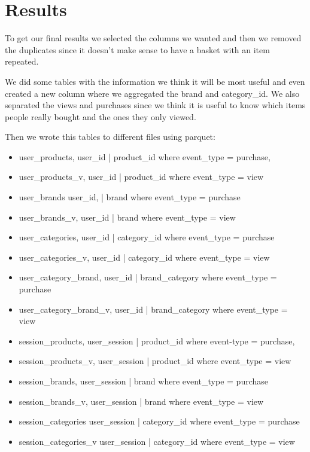 \section{Results}
\label{results}

To get our final results we selected the columns we wanted and then we removed the duplicates since it doesn't make
sense to have a basket with an item repeated. 

We did some tables with the information we think it will be most useful and even created a new column where we aggregated
the brand and category_id. We also separated the views and purchases since we think it is useful to know which items
people really bought and the ones they only viewed.

Then we wrote this tables to different files using parquet:
\begin{itemize}
    \item user_products, user_id | product_id where event_type = purchase, 
    \item user_products_v, user_id | product_id where event_type = view 
    \item user_brands user_id, | brand where event_type = purchase
    \item user_brands_v, user_id | brand where event_type = view
    \item user_categories, user_id | category_id where event_type = purchase
    \item user_categories_v, user_id | category_id where event_type = view
    \item user_category_brand, user_id | brand_category where event_type = purchase
    \item user_category_brand_v, user_id | brand_category where event_type = view
    \item session_products, user_session | product_id where event-type = purchase, 
    \item session_products_v, user_session | product_id where event_type = view 
    \item session_brands, user_session | brand where event_type = purchase
    \item session_brands_v, user_session | brand where event_type = view
    \item session_categories user_session | category_id where event_type = purchase
    \item session_categories_v user_session | category_id where event_type = view
\end{itemize}

